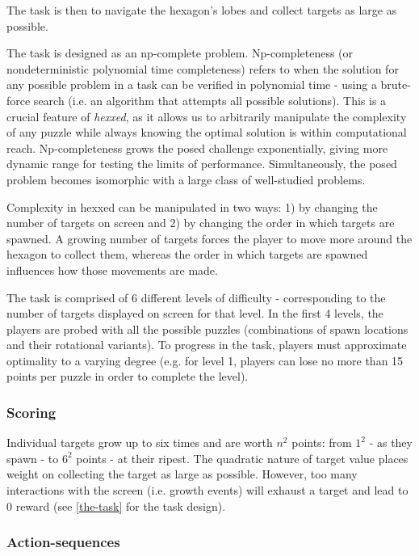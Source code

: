\documentclass[11pt]{article}
\begin{document}
The task is then to navigate the hexagon's lobes and collect targets as large as possible.

The task is designed as an np-complete problem. Np-completeness (or nondeterministic polynomial time completeness) refers to when the solution for any possible problem in a task can be verified in polynomial time - using a brute-force search (i.e. an algorithm that attempts all possible solutions). This is a crucial feature of \textit{hexxed}, as it allows us to arbitrarily manipulate the complexity of any puzzle while always knowing the optimal solution is within computational reach. Np-completeness grows the posed challenge exponentially, giving more dynamic range for testing the limits of performance. Simultaneously, the posed problem becomes isomorphic with a large class of well-studied problems.

Complexity in hexxed can be manipulated in two ways: 1) by changing the number of targets on screen and 2) by changing the order in which targets are spawned. A growing number of targets forces the player to move more around the hexagon to collect them, whereas the order in which targets are spawned influences how those movements are made.



The task is comprised of 6 different levels of difficulty - corresponding to the number of targets displayed on screen for that level. In the first 4 levels, the players are probed with all the possible puzzles (combinations of spawn locations and their rotational variants). To progress in the task, players must approximate optimality to a varying degree (e.g. for level 1, players can lose no more than 15 points per puzzle in order to complete the level).


\subsubsection{Scoring}
Individual targets grow up to six times and are worth \(n^2\) points: from \(1^2\) - as they spawn - to \(6^2\) points - at their ripest. The quadratic nature of target value places weight on collecting the target as large as possible. However, too many interactions with the screen (i.e. growth events) will exhaust a target and lead to 0 reward (see \ref{the-task} for the task design).

\subsubsection{Action-sequences}\label{action-sequences}
\end{document}
